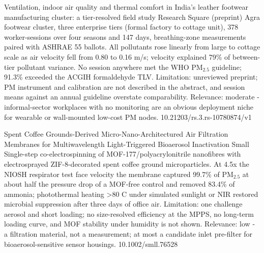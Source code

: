 \documentclass[10pt]{article}
\begin{document}
\par{}\baselineskip{}\baselineskip
{}

{Ventilation, indoor air quality and thermal comfort in India's leather footwear manufacturing cluster: a tier-resolved field study}
{Research Square (preprint)}
{Agra footwear cluster, three enterprise tiers (formal factory to cottage unit), 378 worker-sessions over four seasons and 147 days, breathing-zone measurements paired with ASHRAE 55 ballots. All pollutants rose linearly from large to cottage scale as air velocity fell from 0.80 to 0.16 m/s; velocity explained 79\% of between-tier pollutant variance. No session anywhere met the WHO PM$_{2.5}$ guideline; 91.3\% exceeded the ACGIH formaldehyde TLV. Limitation: unreviewed preprint; PM instrument and calibration are not described in the abstract, and session means against an annual guideline overstate comparability. Relevance: moderate - informal-sector workplaces with no monitoring are an obvious deployment niche for wearable or wall-mounted low-cost PM nodes.}
{10.21203/rs.3.rs-10780874/v1}

{Spent Coffee Grounds-Derived Micro-Nano-Architectured Air Filtration Membranes for Multiwavelength Light-Triggered Bioaerosol Inactivation}
{Small}
{Single-step co-electrospinning of MOF-177/polyacrylonitrile nanofibres with electrosprayed ZIF-8-decorated spent coffee ground microparticles. At 4.5x the NIOSH respirator test face velocity the membrane captured 99.7\% of PM$_{2.5}$ at about half the pressure drop of a MOF-free control and removed 83.4\% of ammonia; photothermal heating >80 C under simulated sunlight or NIR restored microbial suppression after three days of office air. Limitation: one challenge aerosol and short loading; no size-resolved efficiency at the MPPS, no long-term loading curve, and MOF stability under humidity is not shown. Relevance: low - a filtration material, not a measurement; at most a candidate inlet pre-filter for bioaerosol-sensitive sensor housings.}
{10.1002/smll.76528}

\par{}\baselineskip{}\baselineskip
{}
\end{document}
